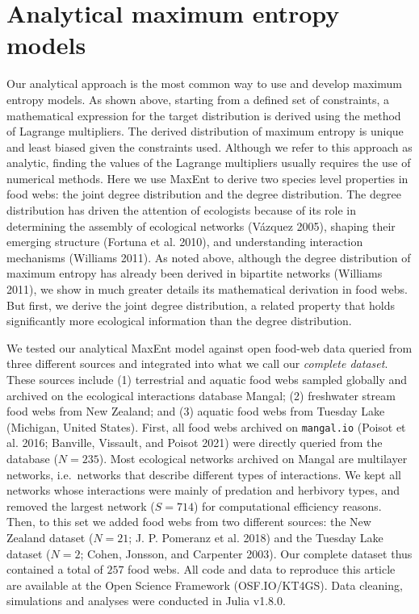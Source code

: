 \documentclass[11pt]{article}
\begin{document}
\hypertarget{analytical-maximum-entropy-models}{%
\section{Analytical maximum entropy
models}\label{analytical-maximum-entropy-models}}

Our analytical approach is the most common way to use and develop
maximum entropy models. As shown above, starting from a defined set of
constraints, a mathematical expression for the target distribution is
derived using the method of Lagrange multipliers. The derived
distribution of maximum entropy is unique and least biased given the
constraints used. Although we refer to this approach as analytic,
finding the values of the Lagrange multipliers usually requires the use
of numerical methods. Here we use MaxEnt to derive two species level
properties in food webs: the joint degree distribution and the degree
distribution. The degree distribution has driven the attention of
ecologists because of its role in determining the assembly of ecological
networks (Vázquez 2005), shaping their emerging structure (Fortuna et
al. 2010), and understanding interaction mechanisms (Williams 2011). As
noted above, although the degree distribution of maximum entropy has
already been derived in bipartite networks (Williams 2011), we show in
much greater details its mathematical derivation in food webs. But
first, we derive the joint degree distribution, a related property that
holds significantly more ecological information than the degree
distribution.

We tested our analytical MaxEnt model against open food-web data queried
from three different sources and integrated into what we call our
\emph{complete dataset}. These sources include (1) terrestrial and
aquatic food webs sampled globally and archived on the ecological
interactions database Mangal; (2) freshwater stream food webs from New
Zealand; and (3) aquatic food webs from Tuesday Lake (Michigan, United
States). First, all food webs archived on \texttt{mangal.io} (Poisot et
al. 2016; Banville, Vissault, and Poisot 2021) were directly queried
from the database (\(N = 235\)). Most ecological networks archived on
Mangal are multilayer networks, i.e.~networks that describe different
types of interactions. We kept all networks whose interactions were
mainly of predation and herbivory types, and removed the largest network
(\(S = 714\)) for computational efficiency reasons. Then, to this set we
added food webs from two different sources: the New Zealand dataset
(\(N = 21\); J. P. Pomeranz et al. 2018) and the Tuesday Lake dataset
(\(N = 2\); Cohen, Jonsson, and Carpenter 2003). Our complete dataset
thus contained a total of \(257\) food webs. All code and data to
reproduce this article are available at the Open Science Framework
(OSF.IO/KT4GS). Data cleaning, simulations and analyses were conducted
in Julia v1.8.0.
\end{document}
